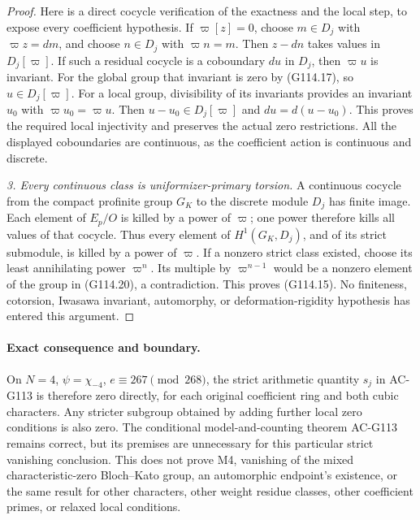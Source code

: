 \begin{proof}
Here is a direct cocycle verification of the exactness and the
local step, to expose every coefficient hypothesis.
If $\varpi[z]=0$, choose $m\in D_j$ with
$\varpi z=dm$, and choose $n\in D_j$ with $\varpi n=m$.
Then $z-dn$ takes values in $D_j[\varpi]$.
If such a residual cocycle is a coboundary $du$ in $D_j$,
then $\varpi u$ is invariant.  For the global group that
invariant is zero by (G114.17), so $u\in D_j[\varpi]$.
For a local group, divisibility of its invariants provides an
invariant $u_0$ with $\varpi u_0=\varpi u$.
Then $u-u_0\in D_j[\varpi]$ and $du=d(u-u_0)$.
This proves the required local injectivity and preserves the
actual zero restrictions.  All the displayed coboundaries are
continuous, as the coefficient action is continuous and discrete.

\emph{3. Every continuous class is uniformizer-primary torsion.}
A continuous cocycle from the compact profinite group $G_K$
to the discrete module $D_j$ has finite image.
Each element of $E_p/O$ is killed by a power of $\varpi$;
one power therefore kills all values of that cocycle.
Thus every element of $H^1(G_K,D_j)$, and of its strict
submodule, is killed by a power of $\varpi$.
If a nonzero strict class existed, choose its least annihilating
power $\varpi^n$.  Its multiple by $\varpi^{n-1}$ would be a
nonzero element of the group in (G114.20), a contradiction.
This proves (G114.15).  No finiteness, cotorsion, Iwasawa
invariant, automorphy, or deformation-rigidity hypothesis has
entered this argument.
\end{proof}

\paragraph{Exact consequence and boundary.}
On $N=4$, $\psi=\chi_{-4}$, $e\equiv267\pmod{268}$,
the strict arithmetic quantity $s_j$ in AC-G113 is therefore
zero directly, for each original coefficient ring and both
cubic characters.  Any stricter subgroup obtained by adding
further local zero conditions is also zero.
The conditional model-and-counting theorem AC-G113 remains
correct, but its premises are unnecessary for this particular
strict vanishing conclusion.
This does not prove M4, vanishing of the mixed characteristic-zero
Bloch--Kato group, an automorphic endpoint's existence, or the
same result for other characters, other weight residue classes,
other coefficient primes, or relaxed local conditions.

